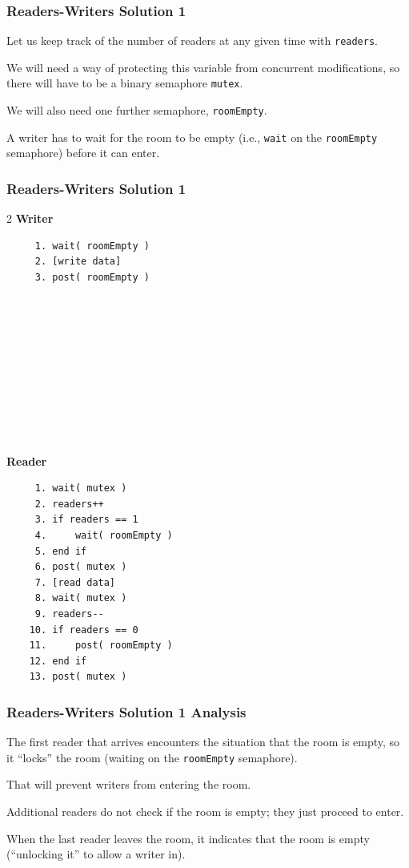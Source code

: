 \begin{frame}
	\frametitle{Readers-Writers Solution 1}
	Let us keep track of the number of readers at any given time with \texttt{readers}.

	We will need a way of protecting this variable from concurrent modifications, so there will have to be a binary semaphore \texttt{mutex}.

	We will also need one further semaphore, \texttt{roomEmpty}.

	A writer has to wait for the room to be empty (i.e., \texttt{wait} on the \texttt{roomEmpty} semaphore) before it can enter.
\end{frame}



\begin{frame}[fragile]
	\frametitle{Readers-Writers Solution 1}

	\begin{multicols}{2}
		\textbf{Writer}
		\begin{verbatim}
	 1. wait( roomEmpty )
	 2. [write data]
	 3. post( roomEmpty )
	 
	 
	 
	 
	 
	 
	 
	 
	 
	 
  \end{verbatim}
		\columnbreak
		\textbf{Reader}
		\begin{verbatim}
	 1. wait( mutex )
	 2. readers++
	 3. if readers == 1
	 4.     wait( roomEmpty )
	 5. end if
	 6. post( mutex )
	 7. [read data]
	 8. wait( mutex )
	 9. readers--
	10. if readers == 0
	11.     post( roomEmpty )
	12. end if
	13. post( mutex )
  \end{verbatim}
	\end{multicols}
	\vspace{-2em}

\end{frame}

\begin{frame}
	\frametitle{Readers-Writers Solution 1 Analysis}

	The first reader that arrives encounters the situation that the room is empty, so it ``locks'' the room (waiting on the \texttt{roomEmpty} semaphore).

	That will prevent writers from entering the room.

	Additional readers do not check if the room is empty; they just proceed to enter.

	When the last reader leaves the room, it indicates that the room is empty (``unlocking it'' to allow a writer in).

\end{frame}

